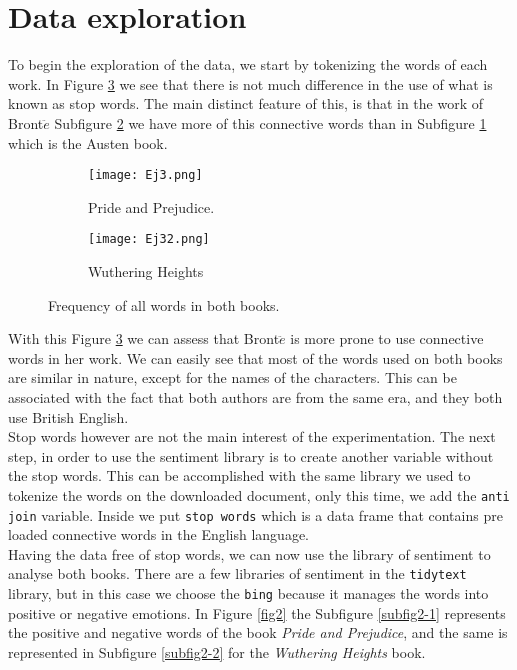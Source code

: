 \documentclass{article}
\begin{document}
\section{Data exploration}

To begin the exploration of the data, we start by tokenizing the words of each work. In Figure \ref{fig1} we see that there is not much difference in the use of what is known as stop words. The main distinct feature of this, is that in the work of Bront$\ddot{e}$ Subfigure \ref{subfig1-2} we have more of this connective words than in Subfigure \ref{subfig1-1} which is the Austen book.\\ 


\begin{figure}[]
\begin{subfigure}{.5\textwidth}
  \centering
  \texttt{[image: Ej3.png]}  
  \caption{Pride and Prejudice.}
  \label{subfig1-1}
\end{subfigure}
\begin{subfigure}{.5\textwidth}
  \centering
  \texttt{[image: Ej32.png]}  
  \caption{Wuthering Heights}
  \label{subfig1-2}
\end{subfigure}
\caption{Frequency of all words in both books.}
\label{fig1}
\end{figure}

\clearpage

With this Figure \ref{fig1} we can assess that Bront$\ddot{e}$ is more prone to use connective words in her work. We can easily see that most of the words used on both books are similar in nature, except for the names of the characters. This can be associated with the fact that both authors are from the same era, and they both use British English.\\

Stop words however are not the main interest of the experimentation. The next step, in order to use the sentiment library is to create another variable without the stop words. This can be accomplished with the same library we used to tokenize the words on the downloaded document, only this time, we add the \texttt{anti join} variable. Inside we put \texttt{stop words} which is a data frame that contains pre loaded connective words in the English language.\\


Having the data free of stop words, we can now use the library of sentiment to analyse both books. There are a few libraries of sentiment in the \texttt{tidytext} library, but in this case we choose the \texttt{bing} because it manages the words into positive or negative emotions. In Figure \ref{fig2} the Subfigure \ref{subfig2-1} represents the positive and negative words of the book \textit{Pride and Prejudice}, and the same is represented in Subfigure \ref{subfig2-2} for the \textit{Wuthering Heights} book.\\
\end{document}
